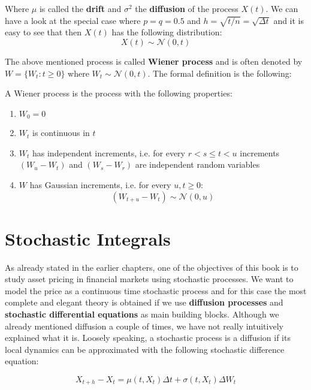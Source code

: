 \documentclass[times, utf8, diplomski]{fer}
\begin{document}
\noindent Where $\mu$ is called the \textbf{drift} and $\sigma^2$ the \textbf{diffusion} of the process $X(t)$. We can have a look at the special case where $p=q=0.5$ and $h=\sqrt{t/n}=\sqrt{\Delta t}$ and it is easy to see that then $X(t)$ has the following distribution:
\begin{equation} 
	X(t) \sim \mathcal{N}(0, t)
\end{equation}	

\noindent The above mentioned process is called \textbf{Wiener process} and is often denoted by $W = \{W_t:t\ge 0\}$ where $W_t \sim \mathcal{N}(0,t)$. The formal definition is the following:

\begin{definition}
A Wiener process is the process with the following properties:
\begin{enumerate}
	\item $W_0 = 0$
	\item $W_t$ is continuous in $t$
	\item $W_t$ has independent increments, i.e. for every $r < s \leq t < u$ increments $(W_u - W_t)$ and $(W_s - W_r)$ are independent random variables
	\item $W$ has Gaussian increments, i.e. for every $u,t \geq 0$: 
		\begin{equation}(W_{t+u} - W_t) \sim \mathcal{N}(0,u) \end{equation}
\end{enumerate}
\end{definition}

\section{Stochastic Integrals}
As already stated in the earlier chapters, one of the objectives of this book is to study asset pricing in financial markets using stochastic processes. We want to model the price as a continuous time stochastic process and for this case the most complete and elegant theory is obtained if we use \textbf{diffusion processes} and \textbf{stochastic differential equations} as main building blocks. Although we already mentioned diffusion a couple of times, we have not really intuitively explained what it is. Loosely speaking, a stochastic process is a diffusion if its local dynamics can be approximated with the following stochastic difference equation:

\begin{equation}
	X_{t+h} - X_t = \mu(t,X_t)\Delta t + \sigma(t, X_t)\Delta W_t
\end{equation}
\end{document}
